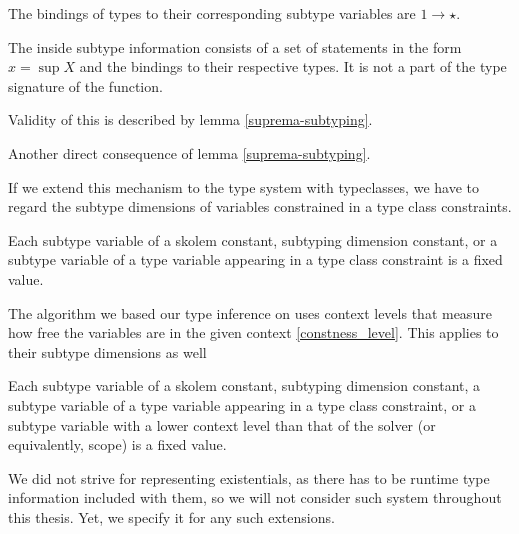\begin{remark}
    The bindings of types to their corresponding subtype variables are $1 \to \star$.
\end{remark}

\begin{defn}
    The inside subtype information consists of a set of statements in the form $x = \sup X$ and the bindings to their respective types. It is not a part of the type signature of the function.

    Validity of this is described by lemma \ref{suprema-subtyping}.
\end{defn}

\begin{remark}
    Another direct consequence of lemma \ref{suprema-subtyping}.
\end{remark}

If we extend this mechanism to the type system with typeclasses, we have to regard the subtype dimensions of variables constrained in a type class constraints.

\begin{defn}
    Each subtype variable of a skolem constant, subtyping dimension constant, or a subtype variable of a type variable appearing in a type class constraint is a fixed value.
\end{defn}


The algorithm we based our type inference on uses context levels that measure how free the variables are in the given context  \ref{constness_level}. This applies to their subtype dimensions as well

\begin{defn}
    Each subtype variable of a skolem constant, subtyping dimension constant, a subtype variable of a type variable appearing in a type class constraint, or a subtype variable with a lower context level than that of the solver (or equivalently, scope) is a fixed value.
\end{defn}

We did not strive for representing existentials, as there has to be runtime type information included with them, so we will not consider such system throughout this thesis. Yet, we specify it for any such extensions.


